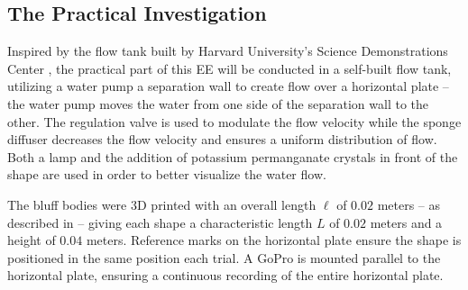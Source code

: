 \subsection{The Practical Investigation}
Inspired by the flow tank built by Harvard University’s Science Demonstrations Center \parencite{noauthor_vortex_nodate}, the practical part of this EE will be conducted in a self-built flow tank, utilizing a water pump a separation wall to create flow over a horizontal plate – the water pump moves the water from one side of the separation wall to the other. The regulation valve is used to modulate the flow velocity while the sponge diffuser decreases the flow velocity and ensures a uniform distribution of flow. Both a lamp and the addition of potassium permanganate crystals in front of the shape are used in order to better visualize the water flow. 

The bluff bodies were 3D printed with an overall length $\ell$ of $0.02$ meters – as described in  – giving each shape a characteristic length $L$ of $0.02$ meters and a height of $0.04$ meters. Reference marks on the horizontal plate ensure the shape is positioned in the same position each trial. A GoPro is mounted parallel to the horizontal plate, ensuring a continuous recording of the entire horizontal plate. 


